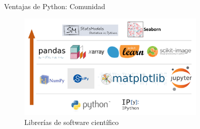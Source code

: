 \documentclass[bigger,unknownkeysallowed]{beamer}
\begin{document}
\begin{frame}[label={sec:org3881acb}]{Ventajas de Python: Comunidad}
\begin{figure}[htbp]
\centering
\includegraphics[width=0.8\textwidth]{librerias_ciencia.png}
\caption{Librerías de software científico}
\end{figure}
\end{frame}
\end{document}
